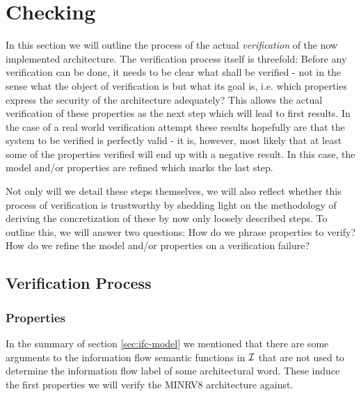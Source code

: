 
\section{Checking}
\label{sec:checking}

In this section we will outline the process of the actual \textit{verification} of the now implemented architecture.
The verification process itself is threefold:
Before any verification can be done, it needs to be clear what shall be verified - not in the sense what the object of verification is but what its goal is, i.e. which properties express the security of the architecture adequately?
This allows the actual verification of these properties as the next step which will lead to first results.
In the case of a real world verification attempt these results hopefully are that the system to be verified is perfectly valid - it is, however, most likely that at least some of the properties verified will end up with a negative result.
In this case, the model and/or properties are refined which marks the last step.

Not only will we detail these steps themselves, we will also reflect whether this process of verification is trustworthy by shedding light on the methodology of deriving the concretization of these by now only loosely described steps.
To outline this, we will answer two questions:
How do we phrase properties to verify?
How do we refine the model and/or properties on a verification failure?

\subsection{Verification Process}

\subsubsection{Properties}
\label{sec:props}


In the summary of section \ref{sec:ifc-model} we mentioned that there are some arguments to the information flow semantic functions in $ \mathcal{I} $ that are not used to determine the information flow label of some architectural word.
These induce the first properties we will verify the MINRV8 architecture against.

